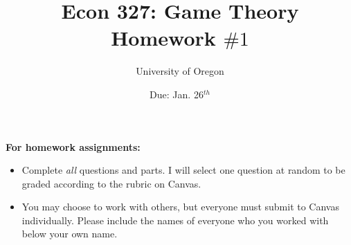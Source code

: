 \documentclass[addpoints ]{exam}
\title{
    \textbf{Econ 327: Game Theory} \\ 
    Homework $\#1$
    }
\author{University of Oregon}
\date{Due: Jan. 26$^{th}$}
\begin{document}
\maketitle

\begin{center}
  \gradetable[h][questions]
\end{center}

\vspace{0.5in}

\begin{center}
  \textbf{For homework assignments:}
\end{center}

\begin{itemize}


  \item Complete \textit{all} questions and parts.
  I will select one question at random to be graded
  according to the rubric on Canvas.

  \item You may choose to work with others,
  but everyone must submit to Canvas individually.
  Please include the names of everyone who you worked with 
  below your own name.
 
\end{itemize}

\vspace{1.0in}


\vspace{0.5in}


\newpage
\end{document}
